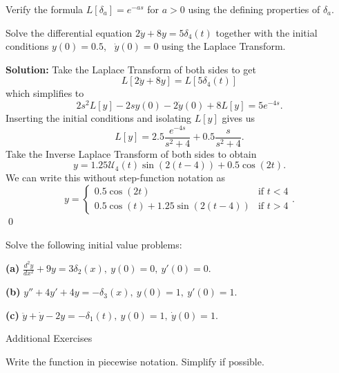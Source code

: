 {{{{\begin{exe} 
Verify the formula $L[\delta_a] = e^{-as}$ for $a>0$ using the defining properties of $\delta_a$.
\end{exe}

\example Solve the differential equation $2 \ddot{y} + 8y = 5 \delta_4(t)$ together with the initial conditions $y(0)=0.5$, \ $\dot{y}(0)=0$ using the Laplace Transform.

{\bf Solution:} Take the Laplace Transform of both sides to get
\[ L[2 \ddot{y} + 8 y ] = L[5\delta_4(t)] \]
which simplifies to
\[ 2s^2 L[y] - 2sy(0)- 2\dot{y}(0) + 8 L[y] = 5 e^{-4s}.\]
Inserting the initial conditions and isolating $L[y]$ gives us
\[ L[y] = 2.5\frac{e^{-4s}}{s^2+4} + 0.5 \frac{s}{s^2+4}.\]
Take the Inverse Laplace Transform of both sides to obtain
\[ y = 1.25 \mathcal{U}_4(t)\sin(2(t-4)) + 0.5 \cos(2t).\]
We can write this without step-function notation as
\[ y = \begin{cases} 0.5 \cos(2t) & \mbox{if } t < 4 \\ 0.5 \cos(t) + 1.25 \sin(2(t-4)) & \mbox{if } t > 4 \end{cases} .\]
\qed

\begin{exe} 
Solve the following initial value problems: 

{\bf (a)} $\frac{d^2y}{dx^2} + 9y = 3 \delta_2(x), \ y(0)=0, \ y'(0)=0$.

{\bf (b)} $y'' + 4y'+4y = - \delta_3(x), \ y(0)=1, \ y'(0)=1$.

{\bf (c)} $\ddot{y} + \dot{y}-2y = - \delta_1(t), \ y(0)=1, \ \dot{y}(0)=1$.
\end{exe}








%
%
%


\newpage
\begin{center} {\LARGE Additional Exercises} \end{center}

\bigskip
\begin{multicols}{2}
\begin{instructions}
Write the function in piecewise notation.  Simplify if possible.
\end{instructions}


\end{multicols}}}}}
